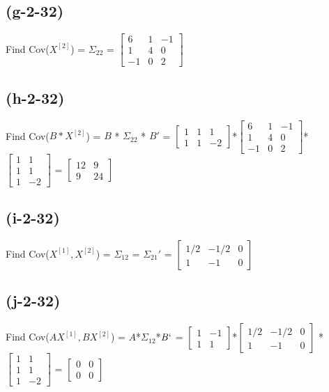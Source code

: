 \documentclass{article}
\begin{document}
\subsection{(g-2-32)}
Find Cov($X^{[2]}$) = $\Sigma_{22}$ = $\left[ 
\begin{array}{ccc}
6 & 1 & -1 \\
1 & 4 & 0 \\
-1& 0 & 2 
\end{array}
\right]$\newline
\subsection{(h-2-32)}
Find Cov($B*X^{[2]}$) = $B$ *  $\Sigma_{22}$ * $B'$ = $\left[
\begin{array}{ccc}
1 & 1 &1 \\
1 & 1 &-2 
\end{array}
\right]
$*$\left[ 
\begin{array}{ccc}
6 & 1 & -1 \\
1 & 4 & 0 \\
-1& 0 & 2 
\end{array}
\right]$* $\left[
\begin{array}{cc}
1 & 1 \\ 
1 &1 \\
1 &-2 
\end{array}
\right]
$ = $\left[ 
\begin{array}{cc}
12 & 9 \\
9 & 24
\end{array}
\right]$\newline
\subsection{(i-2-32)}
Find Cov($X^{[1]},X^{[2]}$) = $ \Sigma_{12}$ = $ \Sigma_{21}'$ = $\left[
\begin{array}{ccc}
1/2 & -1/2 & 0 \\
1 & -1 & 0 
\end{array}
\right]$ \newline  
\subsection{(j-2-32)}
Find Cov($AX^{[1]},BX^{[2]}$) =  $A$*$ \Sigma_{12}$*$B`$ = $\left[
\begin{array}{cc}
1 & -1 \\
1 & 1
\end{array}
\right]
$*$\left[
\begin{array}{ccc}
1/2 & -1/2 & 0 \\
1 & -1 & 0 
\end{array}
\right]$ * $\left[
\begin{array}{cc}
1 & 1 \\ 
1 &1 \\
1 &-2 
\end{array}
\right]
$ = 
$\left[
\begin{array}{cc}
0 & 0 \\
0 & 0
\end{array}
\right]
$\newline
\end{document}
